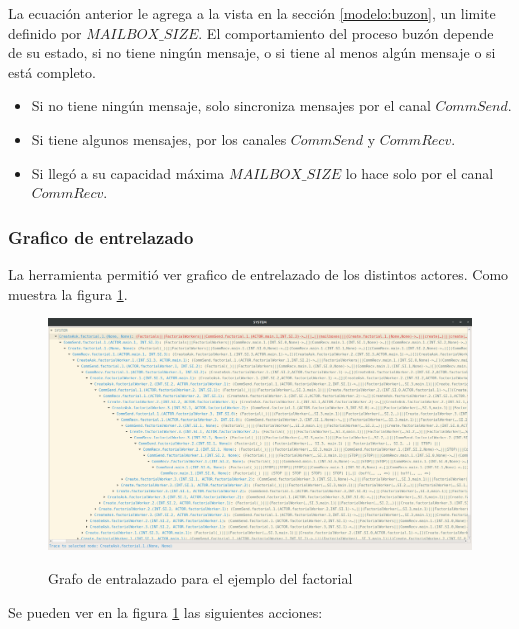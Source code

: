 La ecuación anterior le agrega a la vista en la sección \ref{modelo:buzon}, un limite definido por $MAILBOX\_SIZE$. El comportamiento del proceso buzón depende de su estado, si no tiene ningún mensaje, o si tiene al menos algún mensaje o si está completo.


\begin{itemize}
\item Si no tiene ningún mensaje, solo sincroniza mensajes por el canal $CommSend$.
\item Si tiene algunos mensajes, por los canales $CommSend$ y $CommRecv$.
\item Si llegó a su capacidad máxima $MAILBOX\_SIZE$ lo hace solo por el canal $CommRecv$.
\end{itemize}

\subsubsection*{Grafico de entrelazado}

La herramienta \FDR permitió ver grafico de entrelazado de los distintos actores. Como muestra la figura \ref{c:grafo}.

\begin{figure}[H]
\begin{center}
\includegraphics[width=15 cm]{img/fact.png}
\label{c:grafo}
\caption{Grafo de entralazado para el ejemplo del factorial}
\end{center}
\end{figure}

Se pueden ver en la figura \ref{c:grafo} las siguientes acciones:

